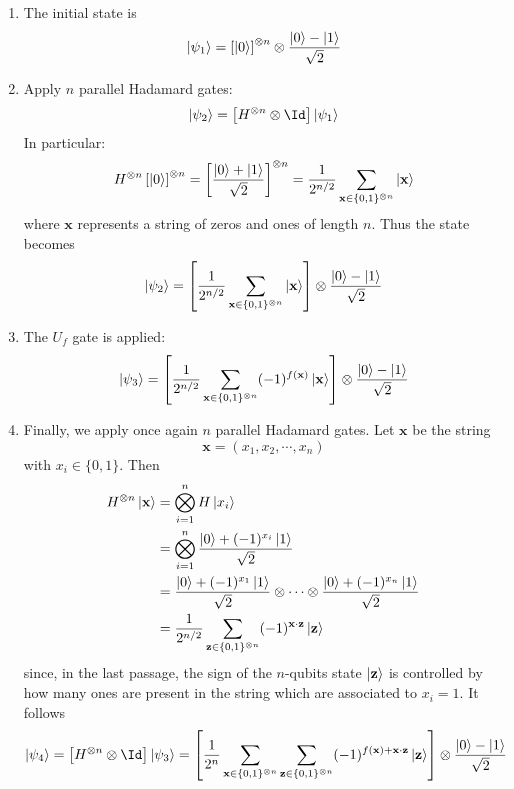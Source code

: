 \begin{enumerate}
    \item The initial state is
    \[
        \ket{\psi_1} = \left[{\ket{0}}\right]^{\otimes n} \otimes \frac{\ket{0} - \ket{1}}{\sqrt{2}}
    \]
    \item Apply $n$ parallel Hadamard gates:
    \[
        \ket{\psi_2} = \lrS{H^{\otimes n} \otimes \Id} \ket{\psi_1} 
    \]
    In particular:
    \[
        H^{\otimes n} \left[{\ket{0}}\right]^{\otimes n} = \left[{\frac{\ket{0} + \ket{1}}{\sqrt{2}}}\right]^{\otimes n} = \frac{1}{2^{n/2}} \sum_{\mathbf{x} \in \lbrace 0,1 \rbrace^{\otimes n}} \ket{\mathbf{x}}
    \]
    where $\mathbf{x}$ represents a string of zeros and ones of length $n$. 
    Thus the state becomes
    \[
        \ket{\psi_2} = \left[{\frac{1}{2^{n/2}} \sum_{\mathbf{x} \in \lbrace 0,1 \rbrace^{\otimes n}} \ket{\mathbf{x}}}\right] \otimes \frac{\ket{0} - \ket{1}}{\sqrt{2}}
    \]
    \item The $U_f$ gate is applied:
    \[
        \ket{\psi_3} = \left[{\frac{1}{2^{n/2}} \sum_{\mathbf{x} \in \lbrace 0,1 \rbrace^{\otimes n}} (-1)^{f(\mathbf{x})} \ket{\mathbf{x}}}\right] \otimes \frac{\ket{0} - \ket{1}}{\sqrt{2}}
    \]
    \item Finally, we apply once again $n$ parallel Hadamard gates. Let $\mathbf{x}$ be the string
    \[
        \mathbf{x} = (x_1, x_2, \cdots, x_n)
    \]
    with $x_i \in \lbrace 0,1 \rbrace$. Then
    \[
    \begin{aligned}
        H^{\otimes n} \ket{\mathbf{x}} &= \bigotimes_{i=1}^n H \ket{x_i} \\
        &= \bigotimes_{i=1}^n \frac{\ket{0} + (-1)^{x_i} \ket{1}}{\sqrt{2}} \\
        &= \frac{\ket{0} + (-1)^{x_1} \ket{1}}{\sqrt{2}} \otimes \cdots \otimes \frac{\ket{0} + (-1)^{x_n} \ket{1}}{\sqrt{2}} \\
        &= \frac{1}{2^{n/2}} \sum_{\mathbf{z} \in \lbrace 0,1 \rbrace^{\otimes n}} (-1)^{\mathbf{x} \cdot \mathbf{z}} \ket{\mathbf{z}}
    \end{aligned}
    \]
    since, in the last passage, the sign of the $n$-qubits state $\ket{\mathbf{z}}$ is controlled by how many ones are present in the string which are associated to $x_i=1$. It follows
    \[
        \ket{\psi_4} = \lrS{H^{\otimes n} \otimes \Id} \ket{\psi_3} = \lrS{\frac{1}{2^n} \sum_{\mathbf{x} \in \lbrace 0,1 \rbrace^{\otimes n}} \sum_{\mathbf{z} \in \lbrace 0,1 \rbrace^{\otimes n}} (-1)^{f(\mathbf{x}) + \mathbf{x} \cdot \mathbf{z}} \ket{\mathbf{z}}} \otimes \frac{\ket{0} - \ket{1}}{\sqrt{2}}
    \]
\end{enumerate}

